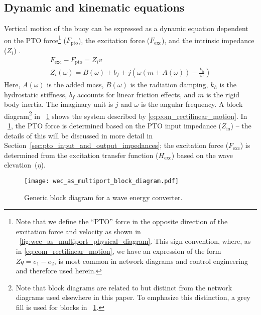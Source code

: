 \documentclass[5p,times]{elsarticle}
\begin{document}
\subsection{Dynamic and kinematic equations}\label{sec:dynamic_and_kinematic_equations}
Vertical motion of the buoy can be expressed as a dynamic equation dependent on the PTO force\footnote{Note that we define the ``PTO'' force in the opposite direction of the excitation force and velocity as shown in \figurename~\ref{fig:wec_as_multiport_physical_diagram}. This sign convention, where, as in \eqref{eq:eom_rectilinear_motion}, we have an expression of the form $Z q = e_1 - e_2$, is most common in network diagrams and control engineering and therefore used herein.} ($F_{\textrm{pto}}$), the excitation force ($F_{\textrm{exc}}$), and the intrinsic impedance ($Z_i$) \cite{Falnes:2002aa}.
%
\begin{subequations}
\begin{gather}
        F_{\textrm{exc}} - F_{\textrm{pto}} = Z_i v \label{eq:eom_rectilinear_motion} \\
        Z_i(\omega) = B(\omega) + b_f + j \left( \omega \left( m + A(\omega) \right) - \frac{k_{h}}{\omega}\right)
\end{gather}
\end{subequations}
%
\noindent{}Here, $A(\omega)$ is the added mass, $B(\omega)$ is the radiation damping, $k_h$ is the hydrostatic stiffness, $b_f$ accounts for linear friction effects, and $m$ is the rigid body inertia.
The imaginary unit is $j$ and $\omega$ is the angular frequency.
A block diagram\footnote{\label{fn:block_diagrams}Note that block diagrams are related to but distinct from the network diagrams used elsewhere in this paper. To emphasize this distinction, a grey fill is used for blocks in \figurename~\ref{fig:wec_as_multiport_block_diagram}.} in \figurename~\ref{fig:wec_as_multiport_block_diagram} shows the system described by \eqref{eq:eom_rectilinear_motion}.
In \figurename~\ref{fig:wec_as_multiport_block_diagram}, the PTO force is determined based on the PTO input impedance ($Z_{\textrm{in}}$) -- the details of this will be discussed in more detail in Section~\ref{sec:pto_input_and_output_impedances}; the excitation force ($F_{\textrm{exc}}$) is determined from the excitation transfer function ($H_{\textrm{exc}}$) based on the wave elevation~($\eta$).

\begin{figure}[tb]
        \centering
        \texttt{[image: wec\_as\_multiport\_block\_diagram.pdf]}
        \caption{Generic block diagram for a wave energy converter.}
        \label{fig:wec_as_multiport_block_diagram}
\end{figure}
\end{document}
